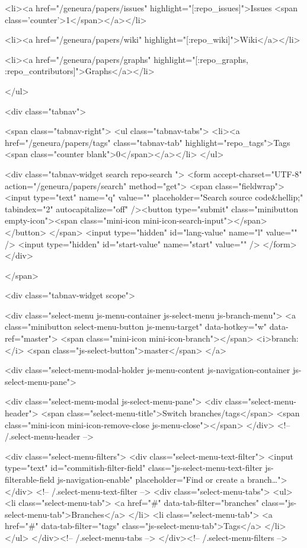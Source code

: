       <li><a href="/geneura/papers/issues" highlight="[:repo_issues]">Issues <span class='counter'>1</span></a></li>

      <li><a href="/geneura/papers/wiki" highlight="[:repo_wiki]">Wiki</a></li>


    <li><a href="/geneura/papers/graphs" highlight="[:repo_graphs, :repo_contributors]">Graphs</a></li>


  </ul>
  
<div class="tabnav">

  <span class="tabnav-right">
    <ul class="tabnav-tabs">
          <li><a href="/geneura/papers/tags" class="tabnav-tab" highlight="repo_tags">Tags <span class="counter blank">0</span></a></li>
    </ul>
    
  <div class="tabnav-widget search repo-search ">
    <form accept-charset="UTF-8" action="/geneura/papers/search" method="get">
      <span class="fieldwrap">
        <input type="text" name="q" value=""
          placeholder="Search source code&hellip;" tabindex="2" autocapitalize="off" /><button type="submit" class="minibutton empty-icon"><span class="mini-icon mini-icon-search-input"></span></button>
      </span>
      <input type="hidden" id="lang-value" name="l" value="" />
      <input type="hidden" id="start-value" name="start" value="" />
</form>  </div>

  </span>

  <div class="tabnav-widget scope">


    <div class="select-menu js-menu-container js-select-menu js-branch-menu">
      <a class="minibutton select-menu-button js-menu-target" data-hotkey="w" data-ref="master">
        <span class="mini-icon mini-icon-branch"></span>
        <i>branch:</i>
        <span class="js-select-button">master</span>
      </a>

      <div class="select-menu-modal-holder js-menu-content js-navigation-container js-select-menu-pane">

        <div class="select-menu-modal js-select-menu-pane">
          <div class="select-menu-header">
            <span class="select-menu-title">Switch branches/tags</span>
            <span class="mini-icon mini-icon-remove-close js-menu-close"></span>
          </div> <!-- /.select-menu-header -->

          <div class="select-menu-filters">
            <div class="select-menu-text-filter">
              <input type="text" id="commitish-filter-field" class="js-select-menu-text-filter js-filterable-field js-navigation-enable" placeholder="Find or create a branch…">
            </div> <!-- /.select-menu-text-filter -->
            <div class="select-menu-tabs">
              <ul>
                <li class="select-menu-tab">
                  <a href="#" data-tab-filter="branches" class="js-select-menu-tab">Branches</a>
                </li>
                <li class="select-menu-tab">
                  <a href="#" data-tab-filter="tags" class="js-select-menu-tab">Tags</a>
                </li>
              </ul>
            </div><!-- /.select-menu-tabs -->
          </div><!-- /.select-menu-filters -->

